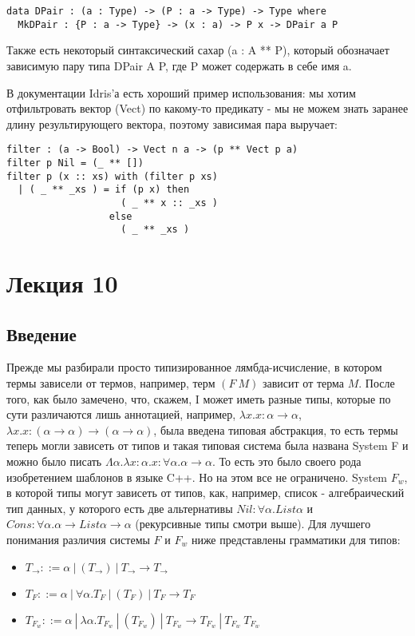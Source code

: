 \begin{verbatim}
data DPair : (a : Type) -> (P : a -> Type) -> Type where
  MkDPair : {P : a -> Type} -> (x : a) -> P x -> DPair a P
\end{verbatim}

Также есть некоторый синтаксический сахар (a : A ** P), который обозначает зависимую пару типа DPair A P, где P может содержать в себе имя a.

В документации Idris'а есть хороший пример использования: мы хотим отфильтровать вектор  (Vect) по какому-то предикату - мы не можем знать заранее длину результирующего вектора, поэтому зависимая пара выручает:

\begin{verbatim}
filter : (a -> Bool) -> Vect n a -> (p ** Vect p a)
filter p Nil = (_ ** [])
filter p (x :: xs) with (filter p xs)
  | ( _ ** _xs ) = if (p x) then 
                    ( _ ** x :: _xs ) 
                  else 
                    ( _ ** _xs )
\end{verbatim}


\section{Лекция 10}

\subsection{Введение}

Прежде мы разбирали просто типизированное лямбда-исчисление, в котором термы зависели от термов, например, терм $(F\ M)$ зависит от терма $M$. После того, как было замечено, что, скажем, I может иметь разные типы, которые по сути различаются лишь аннотацией, например, $\lambda x. x : \alpha \rightarrow \alpha$, $\lambda x. x : (\alpha \rightarrow \alpha) \rightarrow (\alpha \rightarrow \alpha)$, была введена типовая абстракция, то есть термы теперь могли зависеть от типов и такая типовая система была названа System F и можно было писать $\Lambda \alpha. \lambda x : \alpha . x : \forall \alpha. \alpha \rightarrow \alpha$. То есть это было своего рода изобретением шаблонов в языке C++. Но на этом все не ограничено. System $F_w$, в которой типы могут зависеть от типов, как, например, список - алгебраический тип данных, у которого есть две альтернативы $Nil : \forall \alpha . List \alpha$ и $Cons : \forall \alpha. \alpha \rightarrow List \alpha \rightarrow \alpha$ (рекурсивные типы смотри выше). Для лучшего понимания различия системы $F$ и $F_w$ ниже представлены грамматики для типов:
\begin{itemize}
    \item $T_\rightarrow ::= \alpha\ |\ (T_\rightarrow)\ |\ T_\rightarrow \rightarrow T_\rightarrow$
    \item $T_F ::= \alpha\ |\ \forall \alpha. T_F\ |\ (T_F)\ |\ T_F \rightarrow T_F$ 
    \item $T_{F_w} ::= \alpha\ |\ \lambda \alpha. T_{F_w}\ |\ (T_{F_w})\ |\ T_{F_w} \rightarrow T_{F_w}\ |\ T_{F_w}\ T_{F_w} $
\end{itemize}

